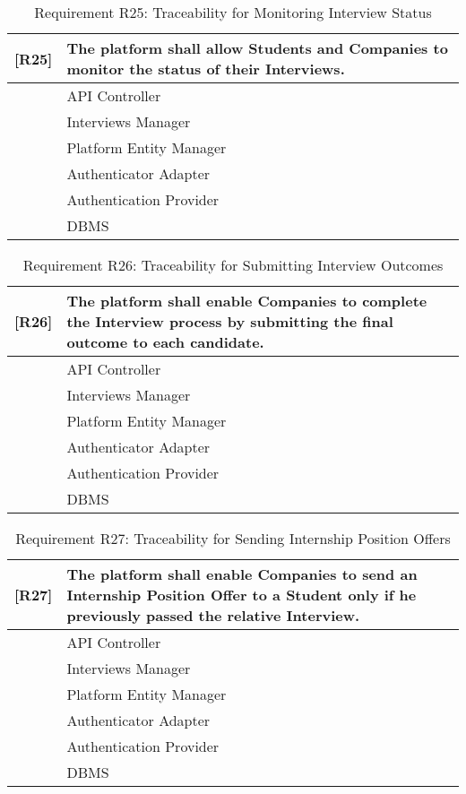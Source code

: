 \begin{table}[H]
    \centering
    \begin{tabular}{|p{1cm}|p{14cm}|}
    \hline
    \textbf{[R25]} & \textbf{The platform shall allow Students and Companies to monitor the status of their Interviews.} \\ \hline
    [C1] & API Controller \\ \hline
    [C6] & Interviews Manager \\ \hline
    [C10] & Platform Entity Manager \\ \hline
    [C11] & Authenticator Adapter \\ \hline
    [E3] & Authentication Provider \\ \hline
    [E4] & DBMS \\ \hline
    \end{tabular}
    \caption{Requirement R25: Traceability for Monitoring Interview Status}
    \label{tab:RT25}
\end{table}

\begin{table}[H]
    \centering
    \begin{tabular}{|p{1cm}|p{14cm}|}
    \hline
    \textbf{[R26]} & \textbf{The platform shall enable Companies to complete the Interview process by submitting the final outcome to each candidate.} \\ \hline
    [C1] & API Controller \\ \hline
    [C6] & Interviews Manager \\ \hline
    [C10] & Platform Entity Manager \\ \hline
    [C11] & Authenticator Adapter \\ \hline
    [E3] & Authentication Provider \\ \hline
    [E4] & DBMS \\ \hline
    \end{tabular}
    \caption{Requirement R26: Traceability for Submitting Interview Outcomes}
    \label{tab:RT26}
\end{table}

\begin{table}[H]
    \centering
    \begin{tabular}{|p{1cm}|p{14cm}|}
    \hline
    \textbf{[R27]} & \textbf{The platform shall enable Companies to send an Internship Position Offer to a Student only if he previously passed the relative Interview.} \\ \hline
    [C1] & API Controller \\ \hline
    [C6] & Interviews Manager \\ \hline
    [C10] & Platform Entity Manager \\ \hline
    [C11] & Authenticator Adapter \\ \hline
    [E3] & Authentication Provider \\ \hline
    [E4] & DBMS \\ \hline
    \end{tabular}
    \caption{Requirement R27: Traceability for Sending Internship Position Offers}
    \label{tab:RT27}
\end{table}

